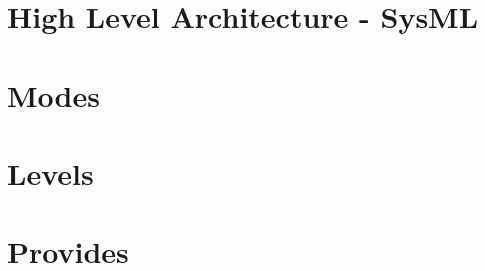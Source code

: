 \documentclass{template/openetcs_report}
\begin{document}
\chapter{High Level Architecture - SysML}



\chapter{Modes}



\chapter{Levels}


\chapter{Provides}








\newpage
{}
\printindex
\end{document}
